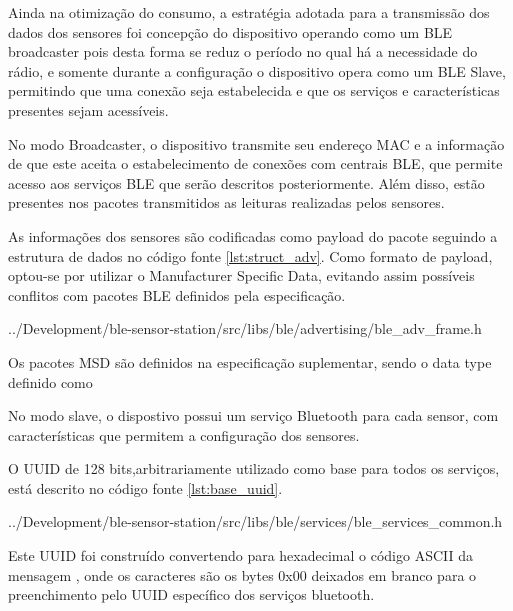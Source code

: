 Ainda na otimização do consumo, a estratégia adotada para a transmissão dos
dados dos sensores foi concepção do dispositivo operando como um BLE broadcaster
pois desta forma se reduz o período no qual há a necessidade do rádio, e
somente durante a configuração o dispositivo opera como um BLE Slave,
permitindo que uma conexão seja estabelecida e que os serviços e
características presentes sejam acessíveis.

No modo Broadcaster, o dispositivo transmite seu endereço MAC e a informação de
que este aceita o estabelecimento de conexões com centrais BLE, que permite
acesso aos serviços BLE que serão descritos posteriormente.
Além disso, estão presentes nos pacotes transmitidos as leituras realizadas
pelos sensores.

As informações dos sensores são codificadas como payload do pacote seguindo a
estrutura de dados no código fonte \ref{lst:struct_adv}. Como formato de
payload, optou-se por utilizar o Manufacturer Specific Data, evitando assim
possíveis conflitos com pacotes BLE definidos pela especificação.


{../Development/ble-sensor-station/src/libs/ble/advertising/ble_adv_frame.h}

Os pacotes MSD são definidos na especificação suplementar, sendo o data type
definido como  

% 

No modo slave, o dispostivo possui um serviço Bluetooth para cada sensor, com
características que permitem a configuração dos sensores.

O UUID de 128 bits,arbitrariamente utilizado como base para
todos os serviços, está descrito no código fonte \ref{lst:base_uuid}.


{../Development/ble-sensor-station/src/libs/ble/services/ble_services_common.h}

Este UUID foi construído convertendo para hexadecimal o código ASCII da mensagem
, onde os caracteres \dblquote{\_\_} são os bytes
0x00 deixados em branco para o preenchimento pelo UUID específico dos serviços
bluetooth.

